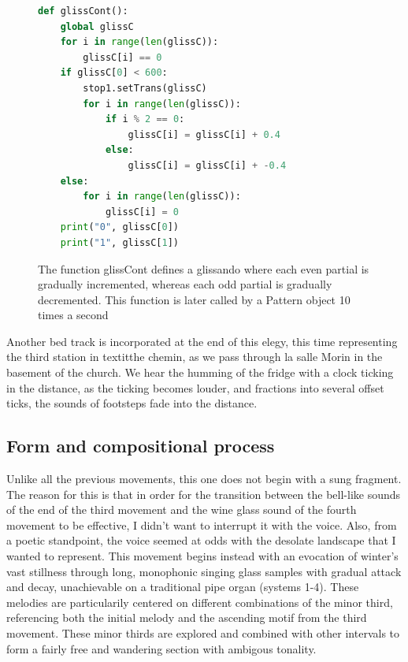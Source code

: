 \documentclass[12pt,twoside,maitrise]{dms_ks}
\theoremstyle{definition}
\begin{document}
{\begin{figure}[H]
\begin{lstlisting}[language=Python]
def glissCont():
    global glissC
    for i in range(len(glissC)):
        glissC[i] == 0
    if glissC[0] < 600:
        stop1.setTrans(glissC)
        for i in range(len(glissC)):
            if i % 2 == 0:
                glissC[i] = glissC[i] + 0.4
            else:
                glissC[i] = glissC[i] + -0.4
    else:
        for i in range(len(glissC)):
            glissC[i] = 0
    print("0", glissC[0])
    print("1", glissC[1])
\end{lstlisting}
\caption{The function glissCont defines a glissando where each even partial is gradually incremented, whereas each odd partial is gradually decremented. This function is later called by a Pattern object 10 times a second}
\end{figure}

Another bed track is incorporated at the end of this elegy, this time representing the third station in textit{the chemin}, as we pass through la salle Morin in the basement of the church. We hear the humming of the fridge with a clock ticking in the distance, as the ticking becomes louder, and fractions into several offset ticks, the sounds of footsteps fade into the distance.

\subsection{Form and compositional process}

Unlike all the previous movements, this one does not begin with a sung fragment. The reason for this is that in order for the transition between the bell-like sounds of the end of the third movement and the wine glass sound of the fourth movement to be effective, I didn't want to interrupt it with the voice. Also, from a poetic standpoint, the voice seemed at odds with the desolate landscape that I wanted to represent.
This movement begins instead with an evocation of winter's vast stillness through long, monophonic singing glass samples with gradual attack and decay, unachievable on a traditional pipe organ (systems 1-4).
These melodies are particularily centered on different combinations of the minor third, referencing both the initial melody and the ascending motif from the third movement.
These minor thirds are explored and combined with other intervals to form a fairly free and wandering section with ambigous tonality.


}
\end{document}
